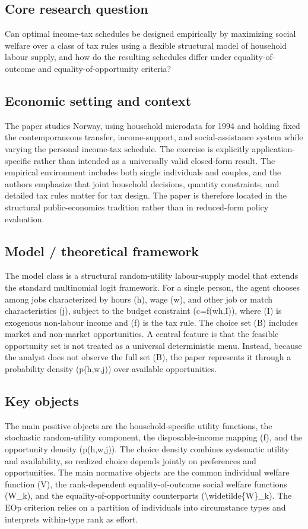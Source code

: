 \documentclass[11pt,a4paper]{article}
\begin{document}
\subsection*{Core research question}
Can optimal income-tax schedules be designed empirically by maximizing social welfare over a class of tax rules using a flexible structural model of household labour supply, and how do the resulting schedules differ under equality-of-outcome and equality-of-opportunity criteria?

\subsection*{Economic setting and context}
The paper studies Norway, using household microdata for 1994 and holding fixed the contemporaneous transfer, income-support, and social-assistance system while varying the personal income-tax schedule. The exercise is explicitly application-specific rather than intended as a universally valid closed-form result. The empirical environment includes both single individuals and couples, and the authors emphasize that joint household decisions, quantity constraints, and detailed tax rules matter for tax design. The paper is therefore located in the structural public-economics tradition rather than in reduced-form policy evaluation.

\subsection*{Model / theoretical framework}
The model class is a structural random-utility labour-supply model that extends the standard multinomial logit framework. For a single person, the agent chooses among jobs characterized by hours (h), wage (w), and other job or match characteristics (j), subject to the budget constraint (c=f(wh,I)), where (I) is exogenous non-labour income and (f) is the tax rule. The choice set (B) includes market and non-market opportunities. A central feature is that the feasible opportunity set is not treated as a universal deterministic menu. Instead, because the analyst does not observe the full set (B), the paper represents it through a probability density (p(h,w,j)) over available opportunities.

\subsection*{Key objects}
The main positive objects are the household-specific utility functions, the stochastic random-utility component, the disposable-income mapping (f), and the opportunity density (p(h,w,j)). The choice density combines systematic utility and availability, so realized choice depends jointly on preferences and opportunities. The main normative objects are the common individual welfare function (V), the rank-dependent equality-of-outcome social welfare functions (W\_k), and the equality-of-opportunity counterparts (\textbackslash{}widetilde\{W\}\_k). The EOp criterion relies on a partition of individuals into circumstance types and interprets within-type rank as effort.
\end{document}
